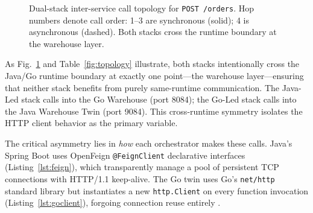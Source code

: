 \documentclass[conference]{IEEEtran}
\begin{document}
\begin{figure}[t]
\caption{Dual-stack inter-service call topology for \texttt{POST /orders}. Hop numbers denote call order: 1--3 are synchronous (solid); 4 is asynchronous (dashed). Both stacks cross the runtime boundary at the warehouse layer.}
\label{fig:architecture}
\end{figure}

As Fig.~\ref{fig:architecture} and Table~\ref{fig:topology} illustrate, both stacks intentionally cross the Java/Go runtime boundary at exactly one point---the warehouse layer---ensuring that neither stack benefits from purely same-runtime communication. The Java-Led stack calls into the Go Warehouse (port 8084); the Go-Led stack calls into the Java Warehouse Twin (port 9084). This cross-runtime symmetry isolates the HTTP client behavior as the primary variable.

The critical asymmetry lies in \textit{how} each orchestrator makes these calls. Java's Spring Boot uses OpenFeign \texttt{@FeignClient} declarative interfaces (Listing~\ref{lst:feign}), which transparently manage a pool of persistent TCP connections with HTTP/1.1 keep-alive. The Go twin uses Go's \texttt{net/http} standard library but instantiates a new \texttt{http.Client} on every function invocation (Listing~\ref{lst:goclient}), forgoing connection reuse entirely \cite{b9}.
\end{document}
